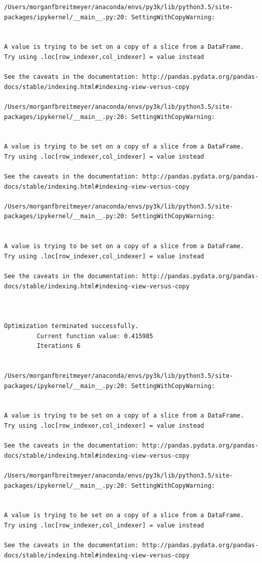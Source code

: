 \begin{lstlisting}
/Users/morganfbreitmeyer/anaconda/envs/py3k/lib/python3.5/site-packages/ipykernel/__main__.py:20: SettingWithCopyWarning:


A value is trying to be set on a copy of a slice from a DataFrame.
Try using .loc[row_indexer,col_indexer] = value instead

See the caveats in the documentation: http://pandas.pydata.org/pandas-docs/stable/indexing.html#indexing-view-versus-copy

/Users/morganfbreitmeyer/anaconda/envs/py3k/lib/python3.5/site-packages/ipykernel/__main__.py:20: SettingWithCopyWarning:


A value is trying to be set on a copy of a slice from a DataFrame.
Try using .loc[row_indexer,col_indexer] = value instead

See the caveats in the documentation: http://pandas.pydata.org/pandas-docs/stable/indexing.html#indexing-view-versus-copy

/Users/morganfbreitmeyer/anaconda/envs/py3k/lib/python3.5/site-packages/ipykernel/__main__.py:20: SettingWithCopyWarning:


A value is trying to be set on a copy of a slice from a DataFrame.
Try using .loc[row_indexer,col_indexer] = value instead

See the caveats in the documentation: http://pandas.pydata.org/pandas-docs/stable/indexing.html#indexing-view-versus-copy



Optimization terminated successfully.
         Current function value: 0.415985
         Iterations 6


/Users/morganfbreitmeyer/anaconda/envs/py3k/lib/python3.5/site-packages/ipykernel/__main__.py:20: SettingWithCopyWarning:


A value is trying to be set on a copy of a slice from a DataFrame.
Try using .loc[row_indexer,col_indexer] = value instead

See the caveats in the documentation: http://pandas.pydata.org/pandas-docs/stable/indexing.html#indexing-view-versus-copy

/Users/morganfbreitmeyer/anaconda/envs/py3k/lib/python3.5/site-packages/ipykernel/__main__.py:20: SettingWithCopyWarning:


A value is trying to be set on a copy of a slice from a DataFrame.
Try using .loc[row_indexer,col_indexer] = value instead

See the caveats in the documentation: http://pandas.pydata.org/pandas-docs/stable/indexing.html#indexing-view-versus-copy


\end{lstlisting}
